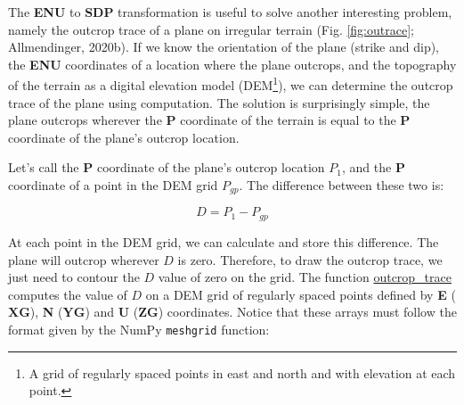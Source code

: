 \documentclass[a4paper , 12pt]{book}
\newcommand{\code}[1]{\colorbox{light-gray}{\texttt{#1}}}
\begin{document}
The \textbf{ENU} to \textbf{SDP} transformation is useful to solve another interesting problem, namely the outcrop trace of a plane on irregular terrain (Fig. \ref{fig:outrace}; Allmendinger, 2020b). If we know the orientation of the plane (strike and dip), the \textbf{ENU} coordinates of a location where the plane outcrops, and the topography of the terrain as a digital elevation model (DEM\footnote{A grid of regularly spaced points in east and north and with elevation at each point.}), we can determine the outcrop trace of the plane using computation. The solution is surprisingly simple, the plane outcrops wherever the \textbf{P} coordinate of the terrain is equal to the \textbf{P} coordinate of the plane's outcrop location.

Let's call the \textbf{P} coordinate of the plane's outcrop location $P_1$, and the \textbf{P} coordinate of a point in the DEM grid $P_{gp}$. The difference between these two is:

\begin{equation}
    D=P_1-P_{gp}
\end{equation}

At each point in the DEM grid, we can calculate and store this difference. The plane will outcrop wherever $D$ is zero. Therefore, to draw the outcrop trace, we just need to contour the $D$ value of zero on the grid. The function \href{https://github.com/nfcd/compGeo/blob/master/source/functions/outcrop_trace.py}{outcrop\_trace} computes the value of $D$ on a DEM grid of regularly spaced points defined by \textbf{E} ($\mathbf{XG}$), \textbf{N} ($\mathbf{YG}$) and \textbf{U} ($\mathbf{ZG}$) coordinates. Notice that these arrays must follow the format given by the NumPy \code{meshgrid} function:
\end{document}
